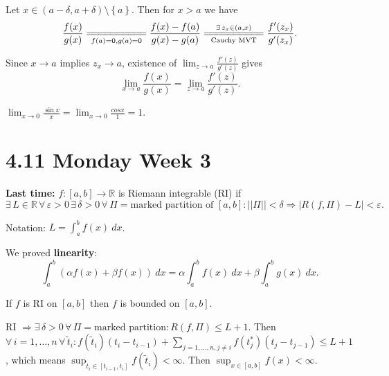 \documentclass{notes}
\begin{document}
  \begin{prf}
    Let $x \in (a - \delta, a + \delta) \setminus \left \{ a \right \}$.
    Then for $x > a$ we have 
    \[
      \frac{f(x)}{g(x)} \underset{f(a) = 0, g(a) = 0}{=\joinrel=\joinrel=\joinrel=\joinrel=\joinrel=\joinrel=\joinrel=\joinrel=\joinrel=} \frac{f(x) - f(a)}{g(x) - g(a)} \overset{\exists \, z_x \in (a, x)}{\underset{\text{Cauchy MVT}}{=\joinrel=\joinrel=\joinrel=\joinrel=\joinrel=\joinrel=\joinrel=\joinrel=\joinrel=}} \frac{f'(z_x)}{g'(z_x)}.
    \]
    
    Since $x \to a$ implies $z_x \to a$, existence of $\lim_{z \to a} \frac{f'(z)}{g'(z)}$ gives 
    \[
      \lim_{x \to a} \frac{f(x)}{g(x)} = \lim_{z \to a} \frac{f'(z)}{g'(z)}.
    \]
  \end{prf}
  
  \begin{eg}
    $\lim_{x \to 0} \frac{\sin x}{x} = \lim_{x \to 0} \frac{cos x}{1} = 1$.
  \end{eg}
  
  \section{4.11 Monday Week 3}

  {\boldmath \bfseries Last time:} $f \colon [a, b] \to \mathbb R$ is Riemann integrable (RI) if 
  \[
    \exists \, L \in \mathbb R \, \forall \, \varepsilon > 0 \, \exists \, \delta > 0 \, \forall \, \Pi = \text{marked partition of $[a, b]$}: || \Pi || < \delta \Rightarrow \left | R(f, \Pi) - L \right | < \varepsilon.
  \]
  
  Notation: $L = \int_a^b f(x)\ dx$.
  
  We proved {\boldmath \bfseries linearity}: 
  \[
    \int_a^b (\alpha f(x) + \beta f(x))\ dx = \alpha \int_a^b f(x)\ dx + \beta \int_a^b g(x)\ dx.
  \]
  
  \begin{lem}
    If $f$ is RI on $[a, b]$ then $f$ is bounded on $[a, b]$.
  \end{lem}
  
  \begin{prf}
    RI $\Rightarrow \exists \, \delta > 0 \, \forall \, \Pi = \text{marked partition}: R(f, \Pi) \leq L + 1$.
    Then $\forall \, i = 1, \dots, n \, \forall \, \tilde t_i: f(\tilde t_i) (t_i - t_{i - 1}) + \sum_{j = 1, \dots, n, j \neq i} f(t_j^*) (t_j - t_{j - 1}) \leq L + 1$, which means $\sup_{\tilde t_i \in [t_{i - 1}, t_i]} f(\tilde t_i) < \infty$.
    Then $\sup_{x \in [a, b]} f(x) < \infty$.
  \end{prf}
  
\end{document}
